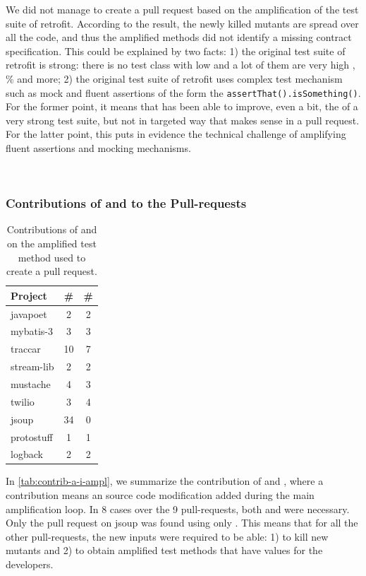 We did not manage to create a pull request based on the amplification of the test suite of retrofit. According to the result, the newly killed mutants are spread over all the code, and thus the amplified methods did not identify a missing contract specification. This could be explained by two facts: 1) the original test suite of retrofit is strong: there is no test class with low \ms and a lot of them are very high \ms, \% and more; 2) the original test suite of retrofit uses complex test mechanism such as mock and fluent assertions of the form the \texttt{assertThat().isSomething()}. For the former point, it means that \dspot has been able to improve, even a bit, the \ms of a very strong test suite, but not in targeted way that makes sense in a pull request. For the latter point, this puts in evidence the technical challenge of amplifying fluent assertions and mocking mechanisms.

~\\

\subsubsection{Contributions of \Aampl and \Iampl to the Pull-requests}

\begin{table}[]
	\caption{Contributions of \Aampl and \Iampl on the amplified test method used to create a pull request.}
	\label{tab:contrib-a-i-ampl}
	\centering\begin{tabular}{lcc}
		\hline
		Project & \#\Aampl &  \#\Iampl \\
		\hline
		javapoet & 2 & 2 \\
		mybatis-3 & 3 & 3 \\
		traccar & 10 & 7 \\
		stream-lib & 2 & 2 \\
		mustache & 4 & 3 \\
		twilio & 3 & 4 \\
		jsoup & 34 & 0 \\
		protostuff & 1 & 1 \\
		logback & 2 & 2 \\
		\hline
	\end{tabular}
\end{table}

In \autoref{tab:contrib-a-i-ampl}, we summarize the contribution of \Aampl and \Iampl, where a contribution means an source code modification added during the main amplification loop. In 8 cases over the 9 pull-requests, both \Aampl and \Iampl were necessary. Only the pull request on jsoup was found using only \Aampl. This means that for all the other pull-requests, the new inputs were required to be able: 1) to kill new mutants and 2) to obtain amplified test methods that have values for the developers.

